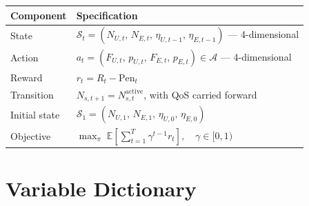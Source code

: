\documentclass[11pt]{article}
\begin{document}
\begin{longtable}{@{}p{}p{}@{}}
\toprule
Component & Specification \\
\midrule
\endhead
State & $\mathcal{S}_t = (N_{U,t},\, N_{E,t},\, \eta_{U,t-1},\, \eta_{E,t-1})$ --- 4-dimensional \\
Action & $a_t = (F_{U,t},\, p_{U,t},\, F_{E,t},\, p_{E,t}) \in \mathcal{A}$ --- 4-dimensional \\
Reward & $r_t = R_t - \mathrm{Pen}_t$ \\
Transition & $N_{s,t+1} = N_{s,t}^{\mathrm{active}}$, with QoS carried forward \\
Initial state & $\mathcal{S}_1 = (N_{U,1},\, N_{E,1},\, \eta_{U,0},\, \eta_{E,0})$ \\
Objective & $\max_{\pi}\; \mathbb{E}\!\left[\sum_{t=1}^{T} \gamma^{t-1} r_t\right], \quad \gamma \in [0,1)$ \\
\bottomrule
\end{longtable}

\section{Variable Dictionary}
\end{document}
